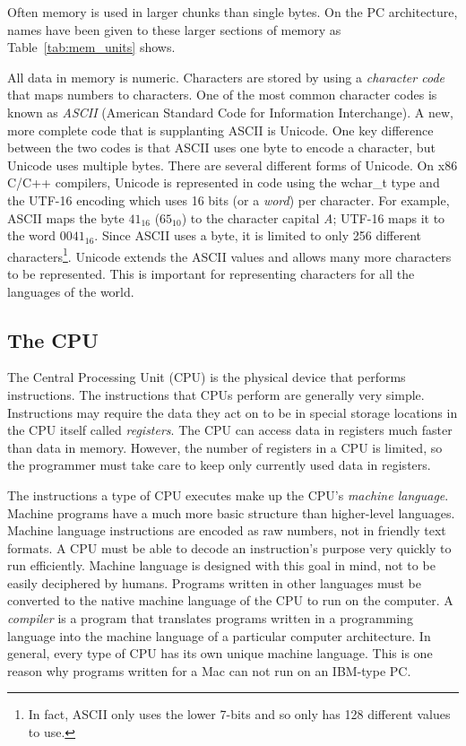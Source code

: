 Often memory is used in larger chunks than single bytes. On
the PC architecture, names have been given to these larger sections of
memory as Table~\ref{tab:mem_units} shows.

All data in memory is numeric. Characters are stored by using a
\emph{character code} that maps numbers to characters. One of the 
most common character codes is known as \emph{ASCII} (American
Standard Code for Information Interchange). A new, more complete code
that is supplanting ASCII is Unicode. One key difference between the
two codes is that ASCII uses one byte to encode a character, but
Unicode uses multiple bytes. There are several different forms of Unicode.
On x86 C/C++ compilers, Unicode is represented in code using the 
{\code wchar\_t} type and the UTF-16 encoding which uses 16 bits (or a 
\emph{word}) per character. For example, ASCII maps the byte $41_{16}$ 
($65_{10}$) to the character capital \emph{A}; UTF-16 maps it to the 
word $0041_{16}$. Since ASCII uses a byte, it is limited to only 256 
different characters\footnote{In fact, ASCII only uses the lower 7-bits 
and so only has 128 different values to use.}. Unicode extends the ASCII 
values and allows many more characters to be represented. This is important 
for representing characters for all the languages of the world.

\subsection{The CPU}

The Central Processing Unit (CPU) is the physical device that performs
instructions. The instructions that CPUs perform are generally very
simple. Instructions may require the data they act on to be in special
storage locations in the CPU itself called
\emph{registers}.  The CPU can access data in registers
much faster than data in memory. However, the number of registers in a
CPU is limited, so the programmer must take care to keep only
currently used data in registers.

The instructions a type of CPU executes make up the CPU's
\emph{machine language}.  Machine programs
have a much more basic structure than higher-level languages. Machine
language instructions are encoded as raw numbers, not in friendly text
formats. A CPU must be able to decode an instruction's purpose very
quickly to run efficiently. Machine language is designed with this
goal in mind, not to be easily deciphered by humans. Programs written
in other languages must be converted to the native machine language of
the CPU to run on the computer. A \emph{compiler}  is
a program that translates programs written in a programming language
into the machine language of a particular computer architecture. In
general, every type of CPU has its own unique machine language. This
is one reason why programs written for a Mac can not run on an
IBM-type PC.

